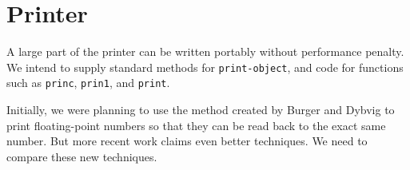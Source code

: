 \chapter{Printer}

A large part of the printer can be written portably without
performance penalty.  We intend to supply standard methods for
\texttt{print-object}, and code for functions such as \texttt{princ},
\texttt{prin1}, and \texttt{print}. 

Initially, we were planning to use the method created by Burger and Dybvig
\cite{Burger:1996:PFN:231379.231397} to print floating-point numbers
so that they can be read back to the exact same number.  But more
recent work \cite{Adams:2018:RFF:3296979.3192369} claims even better
techniques.  We need to compare these new techniques.
